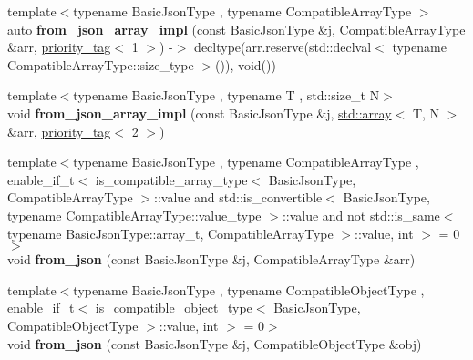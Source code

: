 \begin{DoxyCompactItemize}
{\footnotesize template$<$typename Basic\+Json\+Type , typename Compatible\+Array\+Type $>$ }\\auto {\bfseries from\+\_\+json\+\_\+array\+\_\+impl} (const Basic\+Json\+Type \&j, Compatible\+Array\+Type \&arr, \mbox{\hyperlink{structnlohmann_1_1detail_1_1priority__tag}{priority\+\_\+tag}}$<$ 1 $>$) -\/$>$ decltype(arr.\+reserve(std\+::declval$<$ typename Compatible\+Array\+Type\+::size\+\_\+type $>$()), void())
\item 
\mbox{\label{namespacenlohmann_1_1detail_a46b0781205d0bdc5a959343b389966a4}} 
{\footnotesize template$<$typename Basic\+Json\+Type , typename T , std\+::size\+\_\+t N$>$ }\\void {\bfseries from\+\_\+json\+\_\+array\+\_\+impl} (const Basic\+Json\+Type \&j, \mbox{\hyperlink{namespacenlohmann_1_1detail_a90aa5ef615aa8305e9ea20d8a947980faf1f713c9e000f5d3f280adbd124df4f5}{std\+::array}}$<$ T, N $>$ \&arr, \mbox{\hyperlink{structnlohmann_1_1detail_1_1priority__tag}{priority\+\_\+tag}}$<$ 2 $>$)
\item 
\mbox{\label{namespacenlohmann_1_1detail_a8dcac00852dbe1f61d1e78135b19d428}} 
{\footnotesize template$<$typename Basic\+Json\+Type , typename Compatible\+Array\+Type , enable\+\_\+if\+\_\+t$<$ is\+\_\+compatible\+\_\+array\+\_\+type$<$ Basic\+Json\+Type, Compatible\+Array\+Type $>$\+::value and std\+::is\+\_\+convertible$<$ Basic\+Json\+Type, typename Compatible\+Array\+Type\+::value\+\_\+type $>$\+::value and not std\+::is\+\_\+same$<$ typename Basic\+Json\+Type\+::array\+\_\+t, Compatible\+Array\+Type $>$\+::value, int $>$  = 0$>$ }\\void {\bfseries from\+\_\+json} (const Basic\+Json\+Type \&j, Compatible\+Array\+Type \&arr)
\item 
\mbox{\label{namespacenlohmann_1_1detail_a5e7a3674e8ac46f8feebad9712d7c55f}} 
{\footnotesize template$<$typename Basic\+Json\+Type , typename Compatible\+Object\+Type , enable\+\_\+if\+\_\+t$<$ is\+\_\+compatible\+\_\+object\+\_\+type$<$ Basic\+Json\+Type, Compatible\+Object\+Type $>$\+::value, int $>$  = 0$>$ }\\void {\bfseries from\+\_\+json} (const Basic\+Json\+Type \&j, Compatible\+Object\+Type \&obj)
\item 
\mbox{\label{namespacenlohmann_1_1detail_a839b0ab50d2c9bce669068f56bc41202}} 

\end{DoxyCompactItemize}
